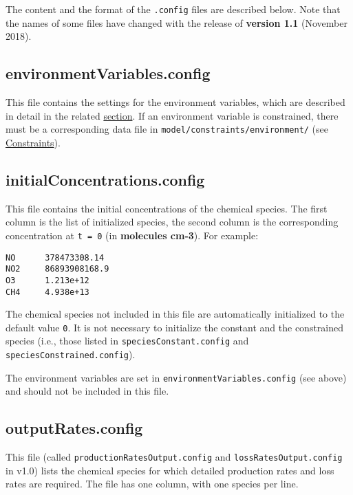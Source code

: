 The content and the format of the \texttt{.config} files are described
below. Note that the names of some files have changed with the release
of \textbf{version 1.1} (November 2018).

\subsection{environmentVariables.config} \label{subsec:environmentvariables}

This file contains the settings for the environment variables, which
are described in detail in the related
\hyperref[sec:environment-variables]{section}. If an environment variable is
constrained, there must be a corresponding data file in
\texttt{model/constraints/environment/} (see
\hyperref[sec:constraints]{Constraints}).

\subsection{initialConcentrations.config} \label{subsec:initialconcentrations}

This file contains the initial concentrations of the chemical species.
The first column is the list of initialized species, the second column
is the corresponding concentration at \texttt{t\ =\ 0} (in
\textbf{molecules cm-3}). For example:

\begin{verbatim}
NO      378473308.14
NO2     86893908168.9
O3      1.213e+12
CH4     4.938e+13
\end{verbatim}

The chemical species not included in this file are automatically
initialized to the default value \texttt{0}. It is not necessary to
initialize the constant and the constrained species (i.e., those
listed in \texttt{speciesConstant.config} and
\texttt{speciesConstrained.config}).

The environment variables are set in
\texttt{environmentVariables.config} (see above) and should not be
included in this file.

\subsection{outputRates.config} \label{subsec:outputrates}

This file (called \texttt{productionRatesOutput.config} and
\texttt{lossRatesOutput.config} in v1.0) lists the chemical species
for which detailed production rates and loss rates are required. The
file has one column, with one species per line.

